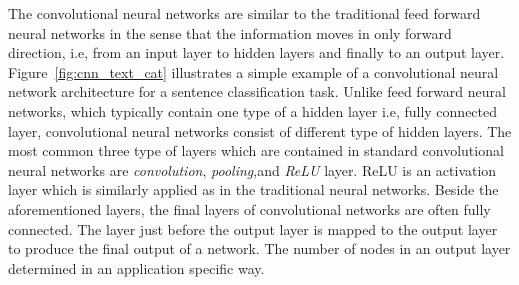 The convolutional neural networks are similar to the traditional feed forward neural networks in the sense that the information moves in only forward direction, i.e, from an input layer to hidden layers and finally to an output layer. Figure~\ref{fig:cnn_text_cat} illustrates a  simple example of a convolutional neural network architecture for a sentence classification task. Unlike feed forward neural networks, which typically contain one type of a hidden layer i.e, fully connected layer, convolutional neural networks consist of different type of hidden layers.  The most common three type of layers which are contained in standard convolutional neural networks are \textit{convolution}, \textit{pooling},and \textit{ReLU} layer. ReLU is an activation layer which is similarly applied as in the traditional neural networks. Beside the aforementioned layers, the final layers of convolutional networks are often fully connected. The layer just before  the output layer is mapped to the output layer to produce the final output of a network. The  number of nodes in an output layer determined in an application specific way.   %

